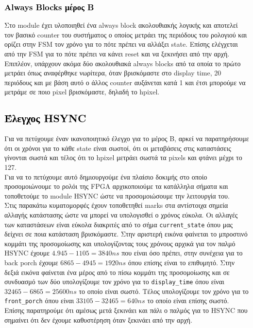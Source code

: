\documentclass[12pt,a4paper]{article}
\begin{document}
	\subsubsection{\textcolor{black}{Always Blocks μέρος Β} }
	Στο module έχει υλοποιηθεί ένα always block ακολουθιακής λογικής και αποτελεί τον βασικό counter του συστήματος ο οποίος μετράει της περιόδους του ρολογιού και ορίζει στην FSM τον χρόνο για το πότε πρέπει να αλλάξει state. Επίσης ελέγχεται από την FSM για το πότε πρέπει να κάνει reset και να ξεκινήσει από την αρχή. Επιπλέον, υπάρχουν ακόμα δύο ακολουθιακά always blocks από τα οποία το πρώτο μετράει όπως αναφέρθηκε νωρίτερα, όταν βρισκόμαστε στο display time, 20 περιόδους και με βάση αυτό ο άλλος counter αυξάνεται κατά 1 και έτσι μπορούμε να μετράμε σε ποιο pixel βρισκόμαστε, δηλαδή το hpixel.
	
	\subsection{\textcolor{black}{Έλεγχος HSYNC} }
	Για να πετύχουμε έναν ικανοποιητικό έλεγχο για το μέρος Β, αρκεί να παρατηρήσουμε ότι οι χρόνοι για το κάθε state είναι σωστοί, ότι οι μεταβάσεις στις καταστάσεις γίνονται σωστά και τέλος ότι το hpixel μετράει σωστά τα pixels και φτάνει μέχρι το 127.\\
	Για να το πετύχουμε αυτό δημιουργούμε ένα πλαίσιο δοκιμής στο οποίο προσομοιώνουμε το ρολόι της FPGA αρχικοποιούμε τα κατάλληλα σήματα και τοποθετούμε το module HSYNC ώστε να προσομοιώσουμε την λειτουργία του.\\
	Στις παρακάτω κυματομορφές έχουν τοποθετηθεί marks στα αντίστοιχα σημεία αλλαγής κατάστασης ώστε να μπορεί να υπολογισθεί ο χρόνος εύκολα. Οι αλλαγές των καταστάσεων είναι εύκολα διακριτές από το σήμα \verb*|current_state| όπου μας δείχνει σε ποια κατάσταση βρισκόμαστε. Στην αριστερή εικόνα φαίνεται το μπροστινό κομμάτι της προσομοίωσης και υπολογίζοντας τους χρόνους αρχικά για τον παλμό HSYNC έχουμε $4.945 - 1105 = 3840ns$ που είναι όσο πρέπει, στην συνέχεια για το back porch έχουμε $6865 - 4945 = 1920 ns$ όπου επίσης είναι το επιθυμητό. Στην δεξιά εικόνα φαίνεται ένα μέρος από το πίσω κομμάτι της προσομοίωσης και σε συνδυασμό των δύο υπολογίζουμε τον χρόνο για το \verb*|display_time| όπου είναι $32465 - 6865 = 25600 ns$ το οποίο είναι σωστό. Τέλος υπολογίζουμε τον χρόνο για το \verb*|front_porch| όπου είναι $33105 - 32465 = 640 ns$ το οποίο είναι επίσης σωστό. Επίσης παρατηρούμε ότι αμέσως μετά ξεκινάει και πάλι ο παλμός για το HSYNC που σημαίνει ότι δεν έχουμε καθυστέρηση όταν ξεκινάει από την αρχή.
\end{document}
